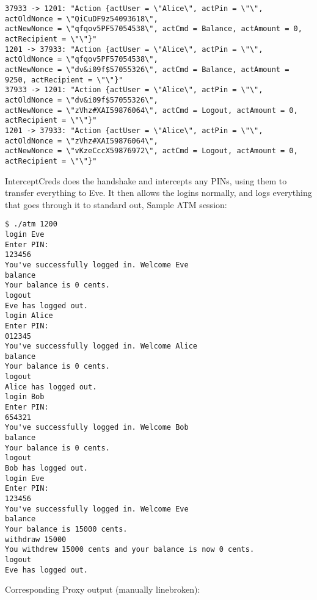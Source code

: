 \documentclass[12pt]{article}
\begin{document}
\begin{Verbatim}[frame=single,fontsize=\scriptsize]
37933 -> 1201: "Action {actUser = \"Alice\", actPin = \"\", actOldNonce = \"QiCuDF9z54093618\", 
actNewNonce = \"qfqov5PF57054538\", actCmd = Balance, actAmount = 0, actRecipient = \"\"}"
1201 -> 37933: "Action {actUser = \"Alice\", actPin = \"\", actOldNonce = \"qfqov5PF57054538\", 
actNewNonce = \"dv&i09f$57055326\", actCmd = Balance, actAmount = 9250, actRecipient = \"\"}"
37933 -> 1201: "Action {actUser = \"Alice\", actPin = \"\", actOldNonce = \"dv&i09f$57055326\", 
actNewNonce = \"zVhz#XAI59876064\", actCmd = Logout, actAmount = 0, actRecipient = \"\"}"
1201 -> 37933: "Action {actUser = \"Alice\", actPin = \"\", actOldNonce = \"zVhz#XAI59876064\", 
actNewNonce = \"vKzeCccX59876972\", actCmd = Logout, actAmount = 0, actRecipient = \"\"}"
\end{Verbatim}
InterceptCreds does the handshake and intercepts any PINs, using them to transfer everything to Eve.
It then allows the logins normally, and logs everything that goes through it to standard out,
Sample ATM session:
\begin{Verbatim}[frame=single,fontsize=\scriptsize]
$ ./atm 1200
login Eve
Enter PIN:
123456
You've successfully logged in. Welcome Eve
balance
Your balance is 0 cents.
logout
Eve has logged out.
login Alice
Enter PIN:
012345
You've successfully logged in. Welcome Alice
balance
Your balance is 0 cents.
logout
Alice has logged out.
login Bob
Enter PIN:
654321
You've successfully logged in. Welcome Bob
balance
Your balance is 0 cents.
logout
Bob has logged out.
login Eve
Enter PIN:
123456
You've successfully logged in. Welcome Eve
balance
Your balance is 15000 cents.
withdraw 15000
You withdrew 15000 cents and your balance is now 0 cents.
logout
Eve has logged out.
\end{Verbatim}
Corresponding Proxy output (manually linebroken):
\end{document}

